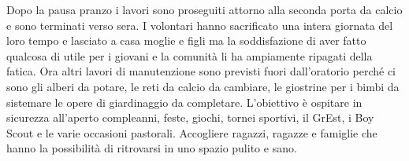 
Dopo la pausa pranzo i lavori sono proseguiti attorno alla seconda porta da calcio e sono terminati verso sera. I volontari hanno sacrificato una intera giornata del loro tempo e lasciato a casa moglie e figli ma la soddisfazione di aver fatto qualcosa di utile per i giovani e la comunità li ha ampiamente ripagati della fatica. Ora altri lavori di manutenzione sono previsti fuori dall'oratorio perché ci sono gli alberi da potare, le reti da calcio da cambiare, le giostrine per i bimbi da sistemare le opere di giardinaggio da completare. L'obiettivo è ospitare in sicurezza all'aperto compleanni, feste, giochi, tornei sportivi, il GrEst, i Boy Scout e le varie occasioni pastorali. Accogliere ragazzi, ragazze e famiglie che hanno la possibilità di ritrovarsi in uno spazio pulito e sano. 


